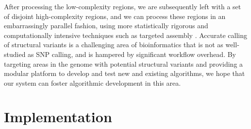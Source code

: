 \documentclass[10pt]{article}
\begin{document}
After processing the low-complexity regions, we are subsequently left with a set
of disjoint high-complexity regions, and we can process 
these regions in an embarrassingly parallel fashion, using more statistically rigorous
and computationally intensive techniques such as targeted assembly \cite{telescoper}.
Accurate calling of structural variants is a challenging area of bioinformatics
that is not as well-studied as SNP calling, and is hampered by significant
workflow overhead.  By targeting areas in the genome with potential structural
variants and providing a modular platform to develop and test new and existing
algorithms, we hope that our system can foster algorithmic development in this
area.

%

\section{Implementation}
\end{document}
